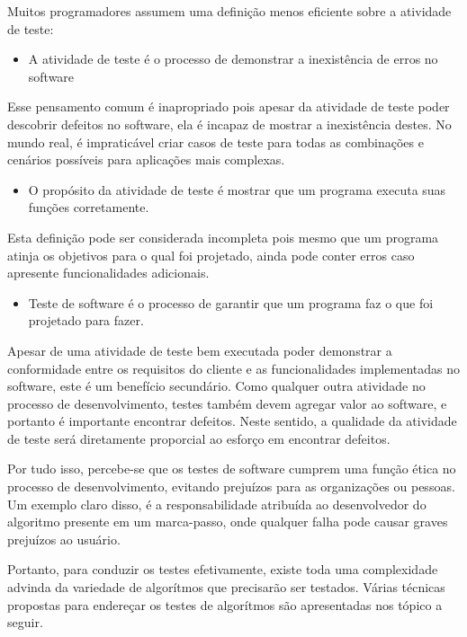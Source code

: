 Muitos programadores assumem uma definição menos eficiente sobre a atividade de teste:

\begin{itemize}
\item A atividade de teste é o processo de demonstrar a inexistência de erros no software
\end{itemize}

Esse pensamento comum é inapropriado pois apesar da atividade de teste poder descobrir defeitos no software, ela é incapaz de mostrar a inexistência destes. No mundo real, é impraticável criar casos de teste para todas as combinações e cenários possíveis para aplicações mais complexas.

\begin{itemize}
\item O propósito da atividade de teste é mostrar que um programa executa suas funções corretamente.
\end{itemize}

Esta definição pode ser considerada incompleta pois mesmo que um programa atinja os objetivos para o qual foi projetado, ainda pode conter erros caso apresente funcionalidades adicionais.

\begin{itemize}
\item Teste de software é o processo de garantir que um programa faz o que foi projetado para fazer.
\end{itemize}

Apesar de uma atividade de teste bem executada poder demonstrar a conformidade entre os requisitos do cliente e as funcionalidades implementadas no software, este é um benefício secundário. Como qualquer outra atividade no processo de desenvolvimento, testes também devem agregar valor ao software, e portanto é importante encontrar defeitos. Neste sentido, a qualidade da atividade de teste será diretamente proporcial ao esforço em encontrar defeitos.

Por tudo isso, percebe-se que os testes de software cumprem uma função ética no processo de desenvolvimento, evitando prejuízos para as organizações ou pessoas. Um exemplo claro disso, é a responsabilidade atribuída ao desenvolvedor do algoritmo presente em um marca-passo, onde qualquer falha pode causar graves prejuízos ao usuário.

Portanto, para conduzir os testes efetivamente, existe toda uma complexidade advinda da variedade de algorítmos que precisarão ser testados. Várias técnicas propostas para endereçar os testes de algorítmos são apresentadas nos tópico a seguir.

